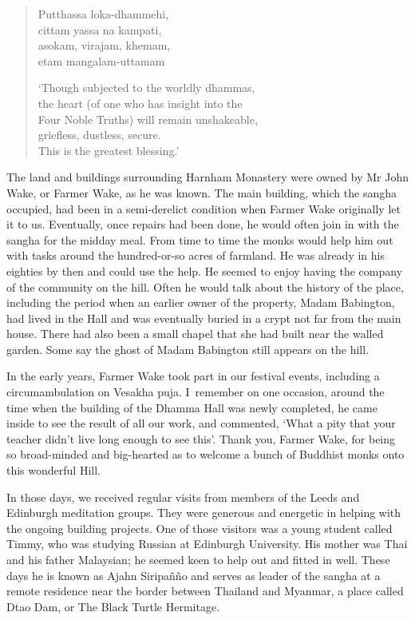 \clearpage

\begin{quote}
  Putthassa loka-dhammehi,\\
  cittam yassa na kampati,\\
  asokam, virajam, khemam,\\
  etam mangalam-uttamam

  `Though subjected to the worldly dhammas,\\
  the heart (of one who has insight into the\\
  Four Noble Truths) will remain unshakeable,\\
  griefless, dustless, secure.\\
  This is the greatest blessing.'
\end{quote}

The land and buildings surrounding Harnham Monastery were owned by Mr
John Wake, or Farmer Wake, as he was known. The main building, which the
sangha occupied, had been in a semi-derelict condition when Farmer Wake
originally let it to us. Eventually, once repairs had been done, he
would often join in with the sangha for the midday meal. From time to
time the monks would help him out with tasks around the hundred-or-so
acres of farmland. He was already in his eighties by then and could use
the help. He seemed to enjoy having the company of the community on the
hill. Often he would talk about the history of the place, including the
period when an earlier owner of the property,
Madam Babington\cite{babington}, had lived in the Hall and was eventually buried in
a crypt not far from the main house. There had also been a small chapel
that she had built near the walled garden. Some say the ghost of Madam
Babington still appears on the hill.

In the early years, Farmer Wake took part in our festival events,
including a circumambulation on Vesakha puja. I~remember on one
occasion, around the time when the building of the Dhamma Hall was newly
completed, he came inside to see the result of all our work, and
commented, `What a pity that your teacher didn't live long enough to see
this'. Thank you, Farmer Wake, for being so broad-minded and big-hearted
as to welcome a bunch of Buddhist monks onto this wonderful Hill.

In those days, we received regular visits from members of the Leeds and
Edinburgh meditation groups. They were generous and energetic in helping
with the ongoing building projects. One of those visitors was a young
student called Timmy, who was studying Russian at Edinburgh University.
His mother was Thai and his father Malaysian; he seemed keen to help out
and fitted in well. These days he is known as Ajahn Siripañño and serves
as leader of the sangha at a remote residence near the border between
Thailand and Myanmar, a place called Dtao Dam, or The Black Turtle
Hermitage.

